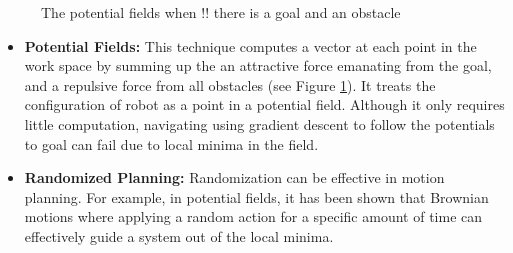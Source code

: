 \begin{figure}[H]
\centering
{}
\caption{The potential fields when !! there is a goal and an obstacle}
\label{potentialexample}
\end{figure}

\begin{itemize}
    \item \textbf{Potential Fields:} This technique computes a vector at each point in the work space by summing up the an attractive force emanating from the goal, and a repulsive force from all obstacles (see Figure \ref{potentialexample}). It treats the configuration of robot as a point in a potential field. Although it only requires little computation, navigating using gradient descent to follow the potentials to goal can fail due to local minima in the field.
    
    \item \textbf{Randomized Planning:} Randomization can be effective in motion planning. For example, in potential fields, it has been shown that Brownian motions where applying a random action for a specific amount of time can effectively guide a system out of the local minima.
\end{itemize}

